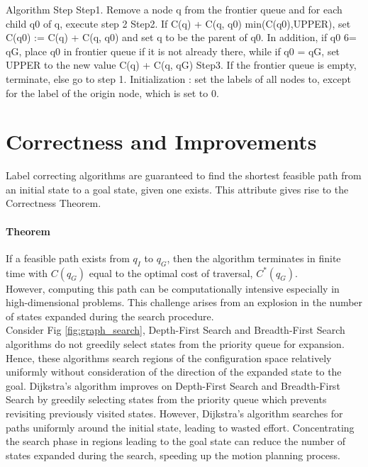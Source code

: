 \documentclass[twoside]{article}
\begin{document}
Algorithm Step
Step1. Remove a node q from the frontier queue and for each child q0 of q, execute step 2
Step2. If C(q) + C(q, q0) min(C(q0),UPPER), set C(q0) := C(q) + C(q, q0) and set q to be the parent of q0. In addition, if q0 6= qG, place q0 in frontier queue if it is not already there, while if q0 = qG, set UPPER to the new value C(q) + C(q, qG)
Step3. If the frontier queue is empty, terminate, else go to step 1.
Initialization : set the labels of all nodes to, except for the label of the origin node, which is set to 0.


\section{Correctness and Improvements}
Label correcting algorithms are guaranteed to find the shortest feasible path from an initial state to a goal state, given one exists. This attribute gives rise to the Correctness Theorem.
\paragraph{Theorem} If a feasible path exists from $q_I$ to $q_G$, then the algorithm terminates in finite time with $C(q_G)$ equal to the optimal cost of traversal, $C^*(q_G)$.\\

However, computing this path can be computationally intensive especially in high-dimensional problems. This challenge arises from an explosion in the number of states expanded during the search procedure. \\
Consider Fig \ref{fig:graph_search}, Depth-First Search and Breadth-First Search algorithms do not greedily select states from the priority queue for expansion. Hence, these algorithms search regions of the configuration space
relatively uniformly without consideration of the direction of the expanded state to the goal. Dijkstra's algorithm improves on Depth-First Search and Breadth-First Search by greedily selecting states from the priority queue which prevents revisiting previously visited states. However, Dijkstra's algorithm searches for paths uniformly around the initial state, leading to wasted effort. Concentrating the search phase in regions leading to the goal state can reduce the number of states expanded during the search, speeding up the motion planning process.
\end{document}
